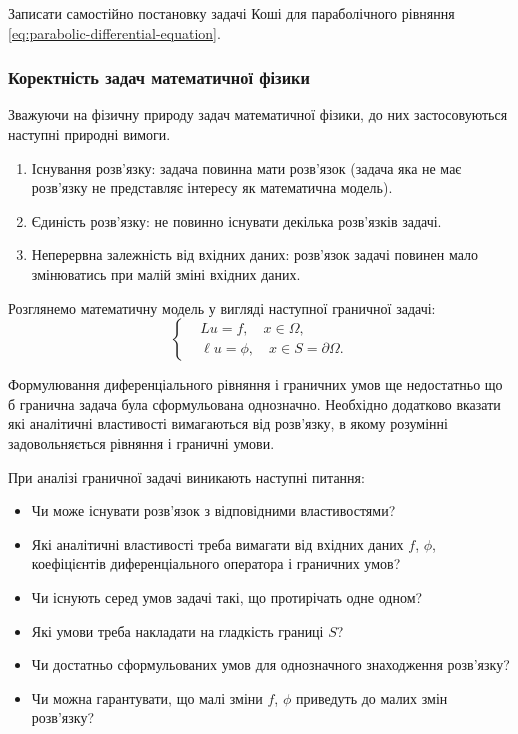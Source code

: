 \begin{exercise}
    Записати самостійно постановку задачі Коші для параболічного рівняння \eqref{eq:parabolic-differential-equation}.
\end{exercise}

\subsubsection{Коректність задач математичної фізики}

Зважуючи на фізичну природу задач математичної фізики, до них застосовуються наступні природні вимоги.
\begin{enumerate}
    \item Існування розв'язку: задача повинна мати розв'язок (задача яка не має розв'язку не представляє інтересу як математична модель).
    \item Єдиність розв’язку: не повинно існувати декілька розв'язків задачі.
    \item Неперервна залежність від вхідних даних: розв'язок задачі повинен мало змінюватись при малій зміні вхідних даних.
\end{enumerate}

Розглянемо математичну модель у вигляді наступної граничної задачі:
\begin{equation}
    \label{eq:boundary-problem}
    \left\{
        \begin{aligned}
            & L u = f, \quad x \in \Omega, \\
            & \ell u = \phi, \quad x \in S = \partial \Omega.
        \end{aligned}
    \right.
\end{equation}

Формулювання диференціального рівняння і граничних умов ще недостатньо що б гранична задача була сформульована однозначно. Необхідно додатково вказати які аналітичні властивості вимагаються від роз\-в'яз\-ку, в якому розумінні задовольняється рівняння і граничні умови. \medskip

При аналізі граничної задачі виникають наступні питання:
\begin{itemize}
    \item Чи може існувати розв'язок з відповідними властивостями?
    \item Які аналітичні властивості треба вимагати від вхідних даних $f$, $\phi$, коефіцієнтів диференціального оператора і граничних умов?
    \item Чи існують серед умов задачі такі, що протирічать одне одном?
    \item Які умови треба накладати на гладкість границі $S$?
    \item Чи достатньо сформульованих умов для однозначного знаходження розв’язку?
    \item Чи можна гарантувати, що малі зміни $f$, $\phi$ приведуть до малих змін розв'язку?
\end{itemize}

